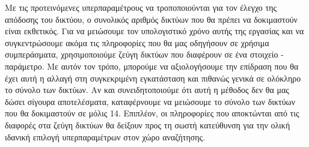 \documentclass[12pt]{report}
\begin{document}
Με τις προτεινόμενες υπερπαραμέτρους να τροποποιούνται για τον έλεγχο της απόδοσης του δικτύου, ο συνολικός αριθμός δικτύων που θα πρέπει να δοκιμαστούν είναι εκθετικός. Για να μειώσουμε τον υπολογιστικό χρόνο αυτής της εργασίας και να συγκεντρώσουμε ακόμα τις πληροφορίες που θα μας οδηγήσουν σε χρήσιμα συμπεράσματα, χρησιμοποιούμε ζεύγη δικτύων που διαφέρουν σε ένα στοιχείο - παράμετρο. Με αυτόν τον τρόπο, μπορούμε να αξιολογήσουμε την επίδραση που θα έχει αυτή η αλλαγή στη συγκεκριμένη εγκατάσταση και πιθανώς γενικά σε ολόκληρο το σύνολο των δικτύων. Αν και συνειδητοποιούμε ότι αυτή η μέθοδος δεν θα μας δώσει σίγουρα αποτελέσματα, καταφέρνουμε να μειώσουμε το σύνολο των δικτύων που θα δοκιμαστούν σε μόλις 14. Επιπλέον, οι πληροφορίες που αποκτώνται από τις διαφορές στα ζεύγη δικτύων θα δείξουν προς τη σωστή κατεύθυνση για την ολική ιδανική επιλογή υπερπαραμέτρων στον χώρο αναζήτησης.
\end{document}
